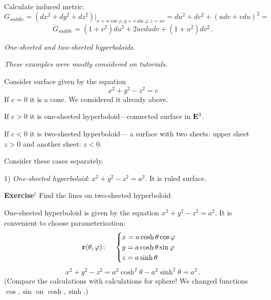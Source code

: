 \documentclass[12pt]{article}
\theoremstyle{theorem}
\numberwithin{equation}{section}
\begin{document}
Calculate induced metric:
                       $$
 G_{saddle}=\left(dx^2+dy^2+dz^2\right)\big\vert_{x=u\cos\varphi,y=v\sin\varphi,z=uv}=
                      du^2+dv^2+(udv+vdu)^2=
                      $$
        \begin{equation*}\label{firtsquadraticformforsaddle(diff)}
            G_{saddle} =(1+v^2)du^2+2uvdudv+(1+u^2)dv^2\,.
            \end{equation*}


    \centerline {\it One-sheeted and two-sheeted hyperboloids.}
{\it These
    examples were mostly considered on tutorials.}

    Consider surface given by the equation
                $$
              x^2+y^2-z^2=c
                $$
    If $c=0$ it is a cone. We considered it already above.

     If $c>0$ it is  one-sheeted hyperboloid---connected surface in ${\bf E}^3$.

     If $c<0$ it is two-sheeted hyperboloid--- a surface with two sheets:
      upper sheet $z>0 $ and another sheet: $z<0$.



     Consider these cases separately.

     \m

    1) {\sl One-sheeted hyperboloid}: $x^2+y^2-z^2=a^2$. It is ruled surface.

    {\bf Exercise}$^\dagger$ Find the lines on two-sheeted hyperboloid



One-sheeted hyperboloid is given by the equation $x^2+y^2-z^2=a^2$.  It is convenient to
choose parameterisation:
\begin{equation}\label{surfaceonesheeteed}
  {\bf r}(\theta,\varphi)\colon\quad
  \begin{cases}
  x=a\cosh\theta\cos\varphi\\
  y=a\cosh\theta\sin\varphi\\
  z=a\sinh\theta\\
  \end{cases}
\end{equation}
   $$
 x^2+y^2-z^2=a^2\cosh^2\theta-a^2\sinh^2\theta=a^2\,.
   $$
(Compare the calculations with calculations for sphere! We changed functions
$\cos, \sin$ on $\cosh,\sinh$.)
\end{document}
